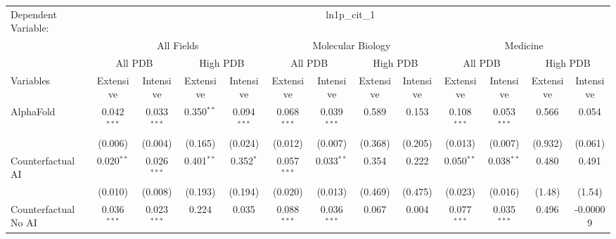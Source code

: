 \begingroup
\centering
\begin{tabular}{lcccccccccccc}
   \tabularnewline \midrule \midrule
   Dependent Variable: & \multicolumn{12}{c}{ln1p\_cit\_1}\\
 & \multicolumn{4}{c}{All Fields} & \multicolumn{4}{c}{Molecular Biology} & \multicolumn{4}{c}{Medicine} \\
\cmidrule(lr){2-5} \cmidrule(lr){6-9} \cmidrule(lr){10-13}
 & \multicolumn{2}{c}{All PDB} & \multicolumn{2}{c}{High PDB} & \multicolumn{2}{c}{All PDB} & \multicolumn{2}{c}{High PDB} & \multicolumn{2}{c}{All PDB} & \multicolumn{2}{c}{High PDB} \\
\cmidrule(lr){2-3} \cmidrule(lr){4-5} \cmidrule(lr){6-7} \cmidrule(lr){8-9} \cmidrule(lr){10-11} \cmidrule(lr){12-13}
Variables & \multicolumn{1}{c}{Extensive} & \multicolumn{1}{c}{Intensive} & \multicolumn{1}{c}{Extensive} & \multicolumn{1}{c}{Intensive} & \multicolumn{1}{c}{Extensive} & \multicolumn{1}{c}{Intensive} & \multicolumn{1}{c}{Extensive} & \multicolumn{1}{c}{Intensive} & \multicolumn{1}{c}{Extensive} & \multicolumn{1}{c}{Intensive} & \multicolumn{1}{c}{Extensive} & \multicolumn{1}{c}{Intensive} \\
\cmidrule(lr){1-1}\cmidrule(lr){2-2} \cmidrule(lr){3-3} \cmidrule(lr){4-4} \cmidrule(lr){5-5} \cmidrule(lr){6-6} \cmidrule(lr){7-7} \cmidrule(lr){8-8} \cmidrule(lr){9-9} \cmidrule(lr){10-10} \cmidrule(lr){11-11} \cmidrule(lr){12-12} \cmidrule(lr){13-13}
   AlphaFold                                & 0.042$^{***}$ & 0.033$^{***}$ & 0.350$^{**}$  & 0.094$^{***}$  & 0.068$^{***}$ & 0.039$^{***}$  & 0.589   & 0.153   & 0.108$^{***}$ & 0.053$^{***}$ & 0.566   & 0.054\\   
                                            & (0.006)       & (0.004)       & (0.165)       & (0.024)        & (0.012)       & (0.007)        & (0.368) & (0.205) & (0.013)       & (0.007)       & (0.932) & (0.061)\\   
   Counterfactual AI                        & 0.020$^{**}$  & 0.026$^{***}$ & 0.401$^{**}$  & 0.352$^{*}$    & 0.057$^{***}$ & 0.033$^{**}$   & 0.354   & 0.222   & 0.050$^{**}$  & 0.038$^{**}$  & 0.480   & 0.491\\   
                                            & (0.010)       & (0.008)       & (0.193)       & (0.194)        & (0.020)       & (0.013)        & (0.469) & (0.475) & (0.023)       & (0.016)       & (1.48)  & (1.54)\\   
   Counterfactual No AI                     & 0.036$^{***}$ & 0.023$^{***}$ & 0.224         & 0.035          & 0.088$^{***}$ & 0.036$^{***}$  & 0.067   & 0.004   & 0.077$^{***}$ & 0.035$^{***}$ & 0.496   & -0.00009\\   

\end{tabular}
